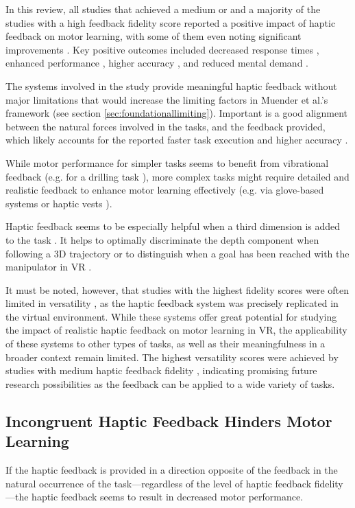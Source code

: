 In this review, all studies that achieved a medium or and a majority of the studies with a high feedback fidelity score reported a positive impact of haptic feedback on motor learning, with some of them even noting significant improvements \cite{Yang2023, LiuH2019, Dai2023, Grant2019, Fehlberg2012, Huang2006}. 
Key positive outcomes included decreased response times \cite{Najdovski2020}, enhanced performance \cite{Chappell2022, Fehlberg2012, Mohanty2023}, higher accuracy \cite{Perez2023}, and reduced mental demand \cite{Yang2023, Trinitatova2023}.

The systems involved in the study provide meaningful haptic feedback without major limitations that would increase the limiting factors in Muender et al.'s framework (see section \ref{sec:foundationallimiting}). Important is a good alignment between the natural forces involved in the tasks, and the feedback provided, which likely accounts for the reported faster task execution and higher accuracy \cite{Najdovski2020, Yang2023}. 

While motor performance for simpler tasks seems to benefit from vibrational feedback (e.g. for a drilling task \cite{Yang2023, Grant2019}), more complex tasks might require detailed and realistic feedback to enhance motor learning effectively (e.g. via glove-based systems \cite{Trinitatova2023} or haptic vests \cite{Xia2023}).

Haptic feedback seems to be especially helpful when a third dimension is added to the task \cite{Gunter2022, Brickler2019}. It helps to optimally discriminate the depth component when following a 3D trajectory or to distinguish when a goal has been reached with the manipulator in VR \cite{Wall2000}.

It must be noted, however, that studies with the highest fidelity scores were often limited in versatility \cite{Huang2007, Vaghela2021}, as the haptic feedback system was precisely replicated in the virtual environment. While these systems offer great potential for studying the impact of realistic haptic feedback on motor learning in VR, the applicability of these systems to other types of tasks, as well as their meaningfulness in a broader context remain limited.
The highest versatility scores were achieved by studies with medium haptic feedback fidelity \cite{Yang2023, McAnally2023}, indicating promising future research possibilities as the feedback can be applied to a wide variety of tasks.


\subsection{Incongruent Haptic Feedback Hinders Motor Learning}
If the haptic feedback is provided in a direction opposite of the feedback in the natural occurrence of the task---regardless of the level of haptic feedback fidelity---the haptic feedback seems to result in decreased motor performance. 

